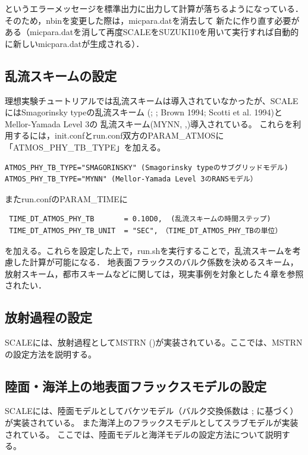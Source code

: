 というエラーメッセージを標準出力に出力して計算が落ちるようになっている．そのため，nbinを変更した際は，micpara.datを消去して
新たに作り直す必要がある（micpara.datを消して再度SCALEをSUZUKI10を用いて実行すれば自動的に新しいmicpara.datが生成される）．


\subsection{乱流スキームの設定} \label{sec:adv_turbulence}
理想実験チュートリアルでは乱流スキームは導入されていなかったが、SCALEにはSmagorinsky typeの乱流スキーム
(\cite{smagorinsky_1963}; \cite{lilly_1962}; Brown 1994; Scotti et al. 1994)とMellor-Yamada Level 3の
乱流スキーム(MYNN, \cite{my_1982},\cite{nakanishi_2004})導入されている。
これらを利用するには，init.confとrun.conf双方のPARAM\_ATMOSに「ATMOS\_PHY\_TB\_TYPE」を加える。

\begin{verbatim}
ATMOS_PHY_TB_TYPE="SMAGORINSKY" (Smagorinsky typeのサブグリッドモデル)
ATMOS_PHY_TB_TYPE="MYNN" (Mellor-Yamada Level 3のRANSモデル）
\end{verbatim}

またrun.confのPARAM\_TIMEに

\begin{verbatim}
 TIME_DT_ATMOS_PHY_TB       = 0.10D0,  (乱流スキームの時間ステップ)
 TIME_DT_ATMOS_PHY_TB_UNIT  = "SEC",　（TIME_DT_ATMOS_PHY_TBの単位）
\end{verbatim}

を加える。これらを設定した上で，run.shを実行することで，乱流スキームを考慮した計算が可能になる．
地表面フラックスのバルク係数を決めるスキーム，放射スキーム，都市スキームなどに関しては，現実事例を対象とした４章を参照されたい．


\subsection{放射過程の設定} \label{sec:adv_radiation}
SCALEには、放射過程としてMSTRN (\cite{sekiguchi_2008})が実装されている。ここでは、MSTRNの設定方法を説明する。



\subsection{陸面・海洋上の地表面フラックスモデルの設定} \label{sec:adv_landocean}
SCALEには、陸面モデルとしてバケツモデル（バルク交換係数は \cite{beljaars_1991}; \cite{wilson_2001}に基づく）が実装されている。
また海洋上のフラックスモデルとしてスラブモデルが実装されている。
ここでは、陸面モデルと海洋モデルの設定方法について説明する。


